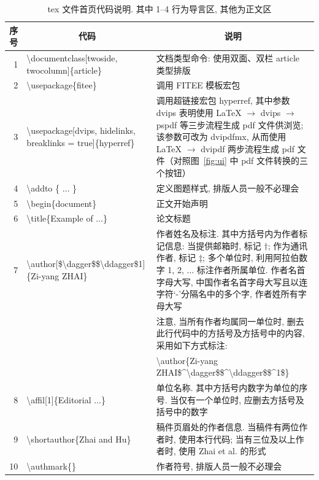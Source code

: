 \documentclass[twoside,twocolumn]{article}
\begin{document}
\begin{CJK}{UTF8}{song}
\begin{table}[!t]
	\centering\footnotesize
	\caption{tex 文件首页代码说明. 其中 1--4 行为导言区, 其他为正文区}
	\label{tab:1stPage}
	\begin{tabular*}{16.4cm}{@{\extracolsep{\fill}}rlp{7.2cm}}
		\toprule[0.75pt]
		序号 & \multicolumn{1}{c}{代码} & \multicolumn{1}{c}{说明}  \\
		\midrule[0.5pt]
		1 & \textbackslash documentclass[twoside, twocolumn]\{article\}    	
		& 文档类型命令: 使用双面、双栏 article 类型排版 \\
		2 & \textbackslash usepackage\{fitee\}     	
		& 调用 FITEE 模板宏包 \\
		3 & \textbackslash usepackage[dvips, hidelinks, breaklinks = true]\{hyperref\}   	
		& 调用超链接宏包 hyperref, 
		其中参数 dvips 表明使用 LaTeX $\rightarrow$ dvips $\rightarrow$ pspdf 等三步流程生成 pdf 文件供浏览; 该参数可改为 dvipdfmx, 从而使用 LaTeX $\rightarrow$ dvipdf 两步流程生成 pdf 文件（对照图~\ref{fig:ui} 中 pdf 文件转换的三个按钮） \\
		4 & \textbackslash addto \{ $\ldots$ \}	& 定义图题样式, 排版人员一般不必理会 \\
		\midrule[0.5pt]
		5 & \textbackslash begin\{document\}     	
		& 正文开始声明 \\
		6 & \textbackslash title\{Example of $\ldots$\}   	
		& 论文标题 \\
		7 & \textbackslash author[\$\textbackslash dagger\$\$\textbackslash ddagger\$1]\{Zi-yang ZHAI\}     	
		& 作者姓名及标注. 其中方括号内为作者标记信息: 
		当提供邮箱时, 标记 $\dagger$; 作为通讯作者, 标记 $\ddagger$; 
		多个单位时, 利用阿拉伯数字 1, 2, $\ldots$ 标注作者所属单位. 作者名首字母大写, 中国作者名首字母大写且以连字符‘-’分隔名中的多个字, 作者姓所有字母大写\\
		&                   & 注意, 当所有作者均属同一单位时, 删去此行代码中的方括号及方括号中的内容, 采用如下方式标注: \\
		&           &
		\textbackslash author\{Zi-yang ZHAI\$\^{}\textbackslash dagger\$\$\^{}\textbackslash ddagger\$\$\^{}1\$\}\\
		8 & \textbackslash affil[1]\{Editorial $\ldots$\}    	
		& 单位名称. 其中方括号内数字为单位的序号. 当仅有一个单位时, 
		应删去方括号及括号中的数字 \\
		9 & \textbackslash shortauthor\{Zhai and Hu\}  & 稿件页眉处的作者信息. 当稿件有两位作者时, 使用本行代码; 当有三位及以上作者时, 使用 Zhai et al. 的形式\\
		10 & \textbackslash authmark\{\}
		& 作者符号, 排版人员一般不必理会\\

\end{tabular*}
\end{table}
\end{CJK}
\end{document}
